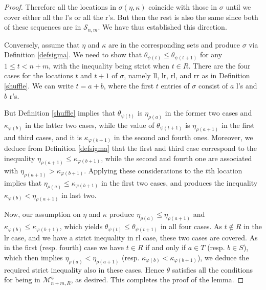 \documentclass[10pt,a4paper]{amsart}
\begin{document}
\begin{proof}
Therefore all the locations in $\sigma(\eta,\kappa)$ coincide with those in $\sigma$ until we cover either all the l's or all the r's. But then the rest is also the same since both of these sequences are in $\mathcal{S}_{n,m}$. We have thus established this direction.

Conversely, assume that $\eta$ and $\kappa$ are in the corresponding sets and produce $\sigma$ via Definition \ref{defsigma}. We need to show that $\theta_{\psi(t)}\leq\theta_{\psi(t+1)}$ for any $1 \leq t<n+m$, with the inequality being strict when $t \in R$. There are the four cases for the locations $t$ and $t+1$ of $\sigma$, namely ll, lr, rl, and rr as in Definition \ref{shuffle}. We can write $t=a+b$, where the first $t$ entries of $\sigma$ consist of $a$ l's and $b$ r's.

But Definition \ref{shuffle} implies that $\theta_{\psi(t)}$ is $\eta_{\rho(a)}$ in the former two cases and $\kappa_{\varphi(b)}$ in the latter two cases, while the value of $\theta_{\psi(t+1)}$ is $\eta_{\rho(a+1)}$ in the first and third cases, and it is $\kappa_{\varphi(b+1)}$ in the second and fourth ones. Moreover, we deduce from Definition \ref{defsigma} that the first and third case correspond to the inequality $\eta_{\rho(a+1)}\leq\kappa_{\varphi(b+1)}$, while the second and fourth one are associated with $\eta_{\rho(a+1)}>\kappa_{\varphi(b+1)}$. Applying these considerations to the $t$th location implies that $\eta_{\rho(a)}\leq\kappa_{\varphi(b+1)}$ in the first two cases, and produces the inequality $\kappa_{\varphi(b)}<\eta_{\rho(a+1)}$ in last two.

Now, our assumption on $\eta$ and $\kappa$ produce $\eta_{\rho(a)}\leq\eta_{\rho(a+1)}$ and $\kappa_{\varphi(b)}\leq\kappa_{\varphi(b+1)}$, which yields $\theta_{\psi(t)}\leq\theta_{\psi(t+1)}$ in all four cases. As $t \not\in R$ in the lr case, and we have a strict inequality in rl case, these two cases are covered. As in the first (resp. fourth) case we have $t \in R$ if and only if $a \in T$ (resp. $b \in S$), which then implies $\eta_{\rho(a)}<\eta_{\rho(a+1)}$ (resp. $\kappa_{\varphi(b)}<\kappa_{\varphi(b+1)}$), we deduce the required strict inequality also in these cases. Hence $\theta$ satisfies all the conditions for being in $\mathcal{M}_{n+m,R}^{\psi}$, as desired. This completes the proof of the lemma.
\end{proof}
\end{document}
